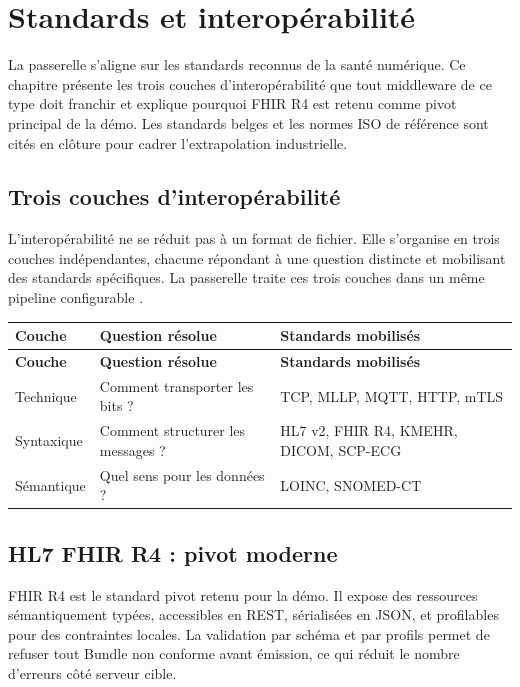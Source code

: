 \chapter{Standards et interopérabilité}
\label{ch:standards}

La passerelle s'aligne sur les standards reconnus de la santé numérique. Ce chapitre présente les trois couches d'interopérabilité que tout middleware de ce type doit franchir et explique pourquoi FHIR R4 est retenu comme pivot principal de la démo. Les standards belges et les normes ISO de référence sont cités en clôture pour cadrer l'extrapolation industrielle.

\section{Trois couches d'interopérabilité}
\label{sec:trois-couches-interop}

L'interopérabilité ne se réduit pas à un format de fichier. Elle s'organise en trois couches indépendantes, chacune répondant à une question distincte et mobilisant des standards spécifiques. La passerelle traite ces trois couches dans un même pipeline configurable \cite{ihe_pcd_tf}.

\bridgezebra
\begin{longtable}{p{3.5cm}p{5.5cm}p{6cm}}
  \toprule
  \rowcolor{bridgeblue!90}
  {\color{white}\bfseries Couche} & {\color{white}\bfseries Question résolue} & {\color{white}\bfseries Standards mobilisés} \\
  \midrule
  \endfirsthead
  \toprule
  \rowcolor{bridgeblue!90}
  {\color{white}\bfseries Couche} & {\color{white}\bfseries Question résolue} & {\color{white}\bfseries Standards mobilisés} \\
  \midrule
  \endhead
  \bottomrule
  \endfoot
  Technique    & Comment transporter les bits ?       & TCP, MLLP, MQTT, HTTP, mTLS \\
  Syntaxique   & Comment structurer les messages ?    & HL7 v2, FHIR R4, KMEHR, DICOM, SCP-ECG \\
  Sémantique   & Quel sens pour les données ?         & LOINC, SNOMED-CT \\
\end{longtable}

\section{HL7 FHIR R4 : pivot moderne}
\label{sec:fhir-pivot}

FHIR R4 \cite{hl7_fhir_r4} est le standard pivot retenu pour la démo. Il expose des ressources sémantiquement typées, accessibles en REST, sérialisées en JSON, et profilables pour des contraintes locales. La validation par schéma et par profils permet de refuser tout Bundle non conforme avant émission, ce qui réduit le nombre d'erreurs côté serveur cible.

